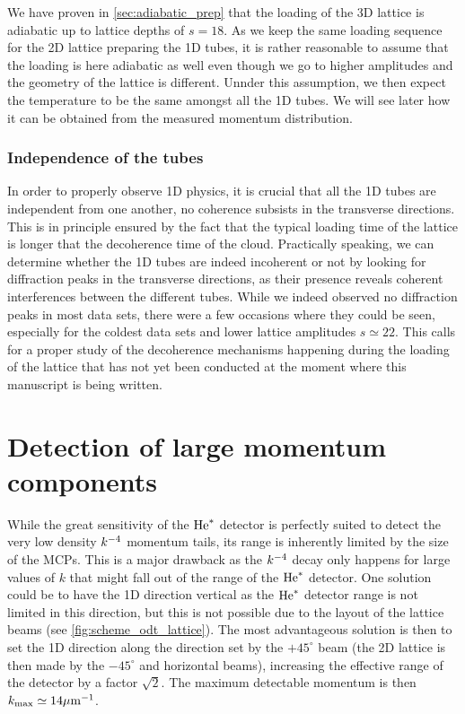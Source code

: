 We have proven in \ref{sec:adiabatic_prep} that the loading of the 3D lattice is adiabatic up to lattice depths of $s=18$. As we keep the same loading sequence for the 2D lattice preparing the 1D tubes, it is rather reasonable to assume that the loading is here adiabatic as well even though we go to higher amplitudes and the geometry of the lattice is different. Unnder this assumption, we then expect the temperature to be the same amongst all the 1D tubes. We will see later how it can be obtained from the measured momentum distribution.

\subsubsection{Independence of the tubes}


In order to properly observe 1D physics, it is crucial that all the 1D tubes are independent from one another, \ie no coherence subsists in the transverse directions. This is in principle ensured by the fact that the typical loading time of the lattice is longer that the decoherence time of the cloud. Practically speaking, we can determine whether the 1D tubes are indeed incoherent or not by looking for diffraction peaks in the transverse directions, as their presence reveals coherent interferences between the different tubes. While we indeed observed no diffraction peaks in most data sets, there were a few occasions where they could be seen, especially for the coldest data sets and lower lattice amplitudes $s \simeq 22$. This calls for a proper study of the decoherence mechanisms happening during the loading of the lattice that has not yet been conducted at the moment where this manuscript is being written. 

\section{Detection of large momentum components}

\label{sec:large_momentum_detection}

While the great sensitivity of the $\mathrm{He}^*$ detector is perfectly suited to detect the very low density $k^{-4}$ momentum tails, its range is inherently limited by the size of the MCPs. This is a major drawback as the $k^{-4}$ decay only happens for large values of $k$ that might fall out of the range of the $\mathrm{He}^*$ detector. One solution could be to have the 1D direction vertical as the $\mathrm{He}^*$ detector range is not limited in this direction, but this is not possible due to the layout of the lattice beams (see \ref{fig:scheme_odt_lattice}). The most advantageous solution is then to set the 1D direction along the direction set by the $+45^{\circ}$ beam (the 2D lattice is then made by the $-45^{\circ}$ and horizontal beams), increasing the effective range of the detector by a factor $\sqrt{2}$. The maximum detectable momentum is then $k_{\rm{max}} \simeq 14 \mu \rm{m}^{-1}$.

